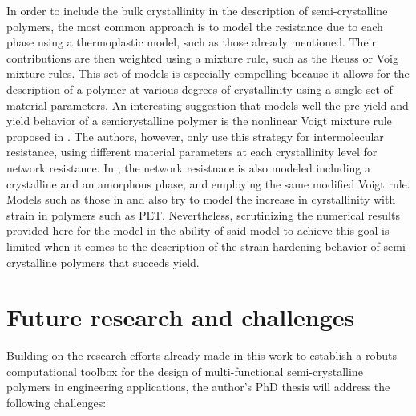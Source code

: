 In order to include the bulk crystallinity in the description of semi-crystalline polymers, the most common approach is to model the resistance due to each phase using a thermoplastic model, such as those already mentioned.
Their contributions are then weighted using a mixture rule, such as the Reuss or Voig mixture rules.
This set of models is especially compelling because it allows for the description of a polymer at various degrees of crystallinity using a single set of material parameters.
An interesting suggestion that models well the pre-yield and yield behavior of a semicrystalline polymer is the nonlinear Voigt mixture rule proposed in \cite{ayoubEffectsCrystalContent2011}.
The authors, however, only use this strategy for intermolecular resistance, using different material parameters at each crystallinity level for network resistance.
In \citep{abdul-hameedTwophaseHyperelasticviscoplasticConstitutive2014}, the network resistnace is also modeled including a crystalline and an amorphous phase, and employing the same modified Voigt rule.
Models such as those in \cite{ahziModelingDeformationBehavior2003, makradiTwophaseSelfconsistentModel2005} and \cite{cundiffModelingViscoplasticBehavior2022} also try to model the increase in cyrstallinity with strain in polymers such as PET.
Nevertheless, scrutinizing the numerical results provided here for the model in \citep{abdul-hameedTwophaseHyperelasticviscoplasticConstitutive2014} the ability of said model to achieve this goal is limited when it comes to the description of the strain hardening behavior of semi-crystalline polymers that succeds yield.
\enlargethispage{\baselineskip}
\section{Future research and challenges}

Building on the research efforts already made in this work to establish a robuts computational toolbox for the design of multi-functional semi-crystalline polymers in engineering applications, the author's PhD thesis will address the following challenges:

